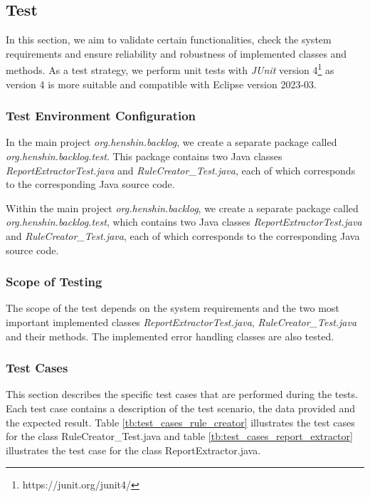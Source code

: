 \subsection{Test}\label{redundancy_test}
In this section, we aim to validate certain functionalities, check the system requirements and ensure reliability and robustness of implemented classes and methods. As a test strategy, we perform unit tests with \textit{JUnit} version 4\footnote{https://junit.org/junit4/} as version 4 is more suitable and compatible with Eclipse version 2023-03.

\subsubsection*{Test Environment Configuration}
In the main project \textit{org.henshin.backlog}, we create a separate package called \textit{org.henshin.backlog.test}. This package contains two Java classes \textit{ReportExtractorTest.java} and \textit{RuleCreator\_Test.java}, each of which corresponds to the corresponding Java source code.

Within the main project \textit{org.henshin.backlog}, we create a separate package called \textit{org.henshin.backlog.test}, which contains two Java classes \textit{ReportExtractorTest.java} and \textit{RuleCreator\_Test.java}, each of which corresponds to the corresponding Java source code.

\subsubsection*{Scope of Testing}
The scope of the test depends on the system requirements and the two most important implemented classes \textit{ReportExtractorTest.java}, \textit{RuleCreator\_Test.java} and their methods. The implemented error handling classes are also tested.

\subsubsection*{Test Cases}
This section describes the specific test cases that are performed during the tests. Each test case contains a description of the test scenario, the data provided and the expected result. Table \ref{tb:test_cases_rule_creator} illustrates the test cases for the class RuleCreator\_Test.java and table \ref{tb:test_cases_report_extractor} illustrates the test case for the class ReportExtractor.java.

